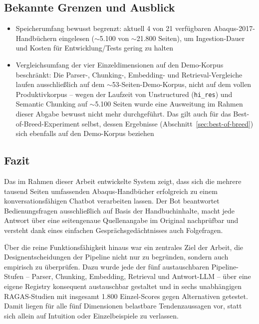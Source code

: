 \documentclass[11pt,a4paper]{article}
\begin{document}
\subsection{Bekannte Grenzen und Ausblick}

\begin{itemize}
    \item Speicherumfang bewusst begrenzt: aktuell 4 von 21 verfügbaren Abaqus-2017-Handbüchern eingelesen ($\sim$5.100 von $\sim$21.800 Seiten), um Ingestion-Dauer und Kosten für Entwicklung/Tests gering zu halten
    \item Vergleichsumfang der vier Einzeldimensionen auf den Demo-Korpus beschränkt: Die Parser-, Chunking-, Embedding- und Retrieval-Vergleiche laufen ausschließlich auf dem $\sim$53-Seiten-Demo-Korpus, nicht auf dem vollen Produktivkorpus -- wegen der Laufzeit von Unstructured (\texttt{hi\_res}) und Semantic Chunking auf $\sim$5.100 Seiten wurde eine Ausweitung im Rahmen dieser Abgabe bewusst nicht mehr durchgeführt. Das gilt auch für das Best-of-Breed-Experiment selbst, dessen Ergebnisse (Abschnitt~\ref{sec:best-of-breed}) sich ebenfalls auf den Demo-Korpus beziehen
\end{itemize}

\subsection{Fazit}
\label{sec:fazit}

Das im Rahmen dieser Arbeit entwickelte System zeigt, dass sich die
mehrere tausend Seiten umfassenden Abaqus-Handbücher erfolgreich zu einem
konversationsfähigen Chatbot verarbeiten lassen. Der Bot beantwortet
Bedienungsfragen ausschließlich auf Basis der Handbuchinhalte, macht jede
Antwort über eine seitengenaue Quellenangabe im Original nachprüfbar und
versteht dank eines einfachen Gesprächsgedächtnisses auch Folgefragen.

Über die reine Funktionsfähigkeit hinaus war ein zentrales Ziel der
Arbeit, die Designentscheidungen der Pipeline nicht nur zu begründen,
sondern auch empirisch zu überprüfen. Dazu wurde jede der fünf
austauschbaren Pipeline-Stufen -- Parser, Chunking, Embedding, Retrieval
und Antwort-LLM -- über eine eigene Registry konsequent austauschbar
gestaltet und in sechs unabhängigen RAGAS-Studien mit insgesamt 1.800
Einzel-Scores gegen Alternativen getestet. Damit liegen für alle fünf
Dimensionen belastbare Tendenzaussagen vor, statt sich allein auf
Intuition oder Einzelbeispiele zu verlassen.
\end{document}
